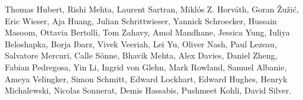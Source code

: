 \label{alphaproof-authors}
Thomas Hubert, Rishi Mehta, Laurent Sartran, Miklós Z. Horváth, Goran Žužić, Eric Wieser, Aja Huang, Julian Schrittwieser, Yannick Schroecker, Hussain Masoom, Ottavia Bertolli, Tom Zahavy, Amol Mandhane, Jessica Yung, Iuliya Beloshapka, Borja Ibarz, Vivek Veeriah, Lei Yu, Oliver Nash, Paul Lezeau, Salvatore Mercuri, Calle Sönne, Bhavik Mehta, Alex Davies, Daniel Zheng, Fabian Pedregosa, Yin Li, Ingrid von Glehn, Mark Rowland, Samuel Albanie, Ameya Velingker, Simon Schmitt, Edward Lockhart, Edward Hughes, Henryk Michalewski, Nicolas Sonnerat, Demis Hassabis, Pushmeet Kohli, David Silver.
